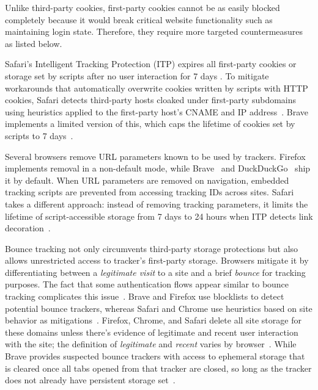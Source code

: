 Unlike third-party cookies, first-party cookies cannot be as easily blocked completely because it would break critical website functionality such as maintaining login state. 
%
Therefore, they require more targeted countermeasures as listed below. 

%
Safari’s Intelligent Tracking Protection (ITP) expires all first-party cookies or storage set by scripts after no user interaction for 7 days \cite{TrackingPreventionWebKit2020}. 
%
To mitigate workarounds that automatically overwrite cookies written by scripts with HTTP cookies, Safari detects third-party hosts cloaked under first-party subdomains using heuristics applied to the first-party host’s CNAME and IP address~\cite{TrackingPreventionWebKit2020}. 
%
Brave implements a limited version of this, which caps the lifetime of cookies set by scripts to 7 days~\cite{bravePrivacyProtectionSecurity}.

%
Several browsers remove URL parameters known to be used by trackers. 
%
Firefox~\cite{mozillaQueryParameterStripping} implements removal in a non-default mode, while Brave~\cite{braveprivacyteamGrabBagQuery2020} and DuckDuckGo~\cite{duckduckgoDuckDuckGoWebTracking} ship it by default. 
%
When URL parameters are removed on navigation, embedded tracking scripts are prevented from accessing tracking IDs across sites. 
%
Safari takes a different approach: instead of removing tracking parameters, it limits the lifetime of script-accessible storage from 7 days to 24 hours when ITP detects link decoration~\cite{TrackingPreventionWebKit2020}.



%
Bounce tracking not only circumvents third-party storage protections but also allows unrestricted access to tracker’s first-party storage. 
%
Browsers mitigate it by differentiating between a \textit{legitimate visit} to a site and a brief \textit{bounce} for tracking purposes. 
%
The fact that some authentication flows appear similar to bounce tracking complicates this issue~\cite{kellyBounceTrackingMitigations2022}. 
%
Brave and Firefox use blocklists to detect potential bounce trackers, whereas Safari and Chrome use heuristics based on site behavior as mitigations~\cite{snyderNavigationalTrackingMitigations2024}. 
%
Firefox, Chrome, and Safari delete all site storage for these domains unless there's evidence of legitimate and recent user interaction with the site; the definition of \textit{legitimate} and \textit{recent} varies by browser~\cite{snyderNavigationalTrackingMitigations2024,TrackingPreventionWebKit2020}. 
%
While Brave provides suspected bounce trackers with access to ephemeral storage that is cleared once all tabs opened from that tracker are closed, so long as the tracker does not already have persistent storage set~\cite{braveprivacyteamUnlinkableBouncingMore2022}.


